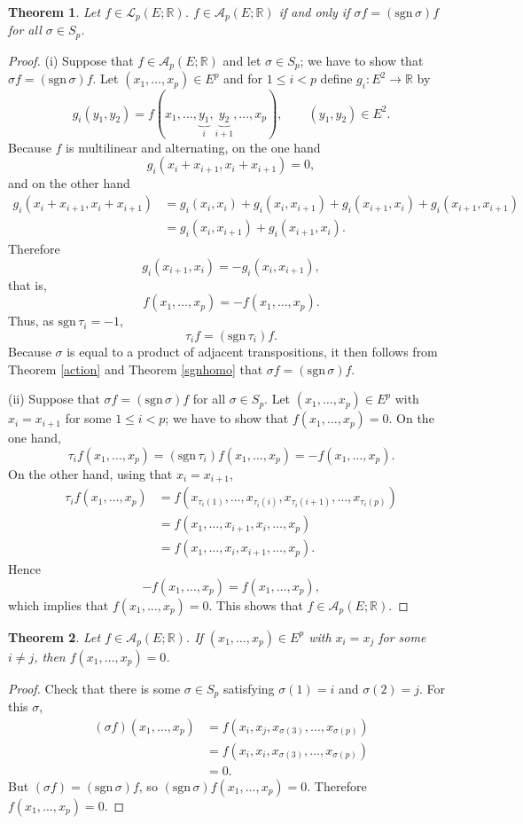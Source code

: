 \documentclass{article}
\newcommand{\sgn}{\mathrm{sgn}\,}
\newtheorem{theorem}{Theorem}
\theoremstyle{definition}
\begin{document}
\begin{theorem}
Let $f \in \mathscr{L}_p(E;\mathbb{R})$. $f \in \mathscr{A}_p(E;\mathbb{R})$ if and only if $\sigma f = (\sgn \sigma) f$ for all
$\sigma \in S_p$.
\label{sgnalternating}
\end{theorem}
\begin{proof}
(i) Suppose that $f \in \mathscr{A}_p(E;\mathbb{R})$ and let $\sigma \in S_p$; we have to show that $\sigma f = (\sgn \sigma) f$. 
Let $(x_1,\ldots,x_p) \in E^p$ and for $1 \leq i < p$ define $g_i:E^2 \to \mathbb{R}$ by
\[
g_i(y_1,y_2) = f(x_1,\ldots,\underbrace{y_1}_i,\underbrace{y_2}_{i+1},\ldots,x_p),
\qquad (y_1,y_2) \in E^2.
\]
Because $f$ is multilinear and alternating, on the one hand
\[
g_i(x_i+x_{i+1},x_i+x_{i+1}) = 0,
\]
and on the other hand
\begin{align*}
g_i(x_i+x_{i+1},x_i+x_{i+1})&=g_i(x_i,x_i)+g_i(x_i,x_{i+1})+
g_i(x_{i+1},x_i)+g_i(x_{i+1},x_{i+1})\\
&=g_i(x_i,x_{i+1})+
g_i(x_{i+1},x_i).
\end{align*} 
Therefore
\[
g_i(x_{i+1},x_i) = -g_i(x_i,x_{i+1}),
\]
that is,
\[
f(x_1,\ldots,x_p) = -f(x_1,\ldots,x_p).
\]
Thus, as $\sgn \tau_i=-1$,
\[
\tau_i f = (\sgn \tau_i) f.
\]
Because $\sigma$ is equal to a product of adjacent transpositions, it then follows from Theorem \ref{action} and
Theorem \ref{sgnhomo} that 
$\sigma f = (\sgn \sigma) f$. 

(ii) Suppose that $\sigma f = (\sgn \sigma) f$ for all $\sigma \in S_p$. 
Let $(x_1,\ldots,x_p) \in E^p$ with $x_i=x_{i+1}$ for some $1 \leq i < p$; we have
to show that $f(x_1,\ldots,x_p)=0$.
On the one hand,
\[
\tau_i f(x_1,\ldots,x_p) = (\sgn \tau_i) f(x_1,\ldots,x_p) = -f(x_1,\ldots,x_p).
\]
On the other hand, using that $x_i=x_{i+1}$,
\begin{align*}
\tau_i f(x_1,\ldots,x_p) &= f(x_{\tau_i(1)},\ldots,x_{\tau_i(i)},
x_{\tau_i(i+1)},\ldots,x_{\tau_i(p)})\\
&=f(x_1,\ldots,x_{i+1},x_i,\ldots,x_p)\\
&=f(x_1,\ldots,x_i,x_{i+1},\ldots,x_p).
\end{align*}
Hence
\[
-f(x_1,\ldots,x_p) = f(x_1,\ldots,x_p),
\]
which implies that $f(x_1,\ldots,x_p)=0$. This shows that $f \in \mathscr{A}_p(E;\mathbb{R})$.
\end{proof}

\begin{theorem}
Let $f \in \mathscr{A}_p(E;\mathbb{R})$. If
$(x_1,\ldots,x_p) \in E^p$ with $x_i=x_j$ for some $i \neq j$, then
$f(x_1,\ldots,x_p) = 0$.
\label{transposition}
\end{theorem}
\begin{proof}
Check that there is some $\sigma \in S_p$ satisfying $\sigma(1)=i$ and $\sigma(2)=j$.
For this $\sigma$,
\begin{align*}
(\sigma f)(x_1,\ldots,x_p) &=f(x_i,x_j,x_{\sigma(3)},\ldots,x_{\sigma(p)})\\
&=f(x_i,x_i,x_{\sigma(3)},\ldots,x_{\sigma(p)})\\
&=0.
\end{align*}
But $(\sigma f) = (\sgn \sigma) f$, so $(\sgn \sigma) f(x_1,\ldots,x_p) = 0$. Therefore
$f(x_1,\ldots,x_p)=0$.
\end{proof}
\end{document}
